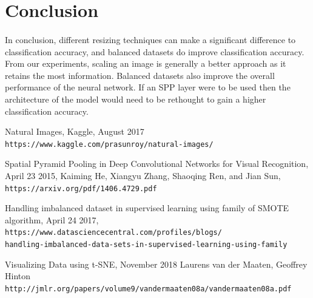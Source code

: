 \documentclass{article}
\begin{document}
\section{Conclusion	}
\paragraph{}
In conclusion, different resizing techniques can make a significant difference to classification accuracy, and balanced datasets do improve classification accuracy. From our experiments, scaling an image is generally a better approach as it retains the most information. Balanced datasets also improve the overall performance of the neural network. If an SPP layer were to be used then the architecture of the model would need to be rethought to gain a higher classification accuracy. 

\begin{thebibliography}{9}
Natural Images, Kaggle, August 2017
\\\texttt{https://www.kaggle.com/prasunroy/natural-images/}
 
Spatial Pyramid Pooling in Deep Convolutional Networks for Visual Recognition, April 23 2015,
Kaiming He, Xiangyu Zhang, Shaoqing Ren, and Jian Sun,
\\\texttt{https://arxiv.org/pdf/1406.4729.pdf}

Handling imbalanced dataset in supervised learning using family of SMOTE algorithm, April 24 2017,
\\\texttt{https://www.datasciencecentral.com/profiles/blogs/\\
handling-imbalanced-data-sets-in-supervised-learning-using-family}

Visualizing Data using t-SNE, November 2018
Laurens van der Maaten, Geoffrey Hinton 
\\\texttt{http://jmlr.org/papers/volume9/vandermaaten08a/vandermaaten08a.pdf}

\end{thebibliography}
\end{document}
